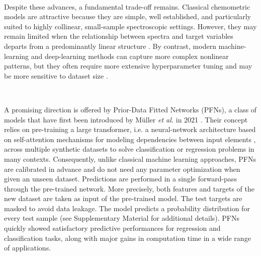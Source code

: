 \documentclass{article}
\begin{document}
~

Despite these advances, a fundamental trade-off remains. Classical chemometric models are attractive because they are simple, well established, and particularly suited to highly collinear, small-sample spectroscopic settings. However, they may remain limited when the relationship between spectra and target variables departs from a predominantly linear structure \cite{limits_linear_nirs}. By contrast, modern machine-learning and deep-learning methods can capture more complex nonlinear patterns, but they often require more extensive hyperparameter tuning and may be more sensitive to dataset size \cite{cat_vs_dl_tabular, dl_nirs_complex_tuning}.

~

A promising direction is offered by Prior-Data Fitted Networks (PFNs), a class of models that have first been introduced by Müller \textit{et al.} in 2021 \cite{muller_transformers_2024}. Their concept relies on pre-training a large transformer, i.e. a neural-network architecture based on self-attention mechanisms for modeling dependencies between input elements \cite{Vaswani2017Attention}, across multiple synthetic datasets to solve classification or regression problems in many contexts. Consequently, unlike classical machine learning approaches, PFNs are calibrated in advance and do not need any parameter optimization when given an unseen dataset. Predictions are performed in a single forward-pass through the pre-trained network. More precisely, both features and targets of the new dataset are taken as input of the pre-trained model. The test targets are masked to avoid data leakage. The model predicts a probability distribution for every test sample (see Supplementary Material for additional details). PFNs quickly showed satisfactory predictive performances for regression and classification tasks, along with major gains in computation time in a wide range of applications.

~ 
\end{document}
